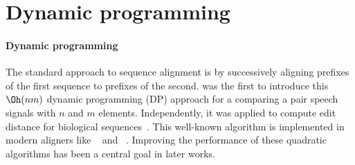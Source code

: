 \section{Dynamic programming}

\paragraph{Dynamic programming} The standard approach to sequence alignment is
by successively aligning prefixes of the first sequence to prefixes of the
second. \citet{vintsyuk1968speech} was the first to introduce this $\Oh(nm)$
dynamic programming (DP) approach for a comparing a pair speech signals with $n$
and $m$ elements. Independently, it was applied to compute edit distance for
biological
sequences~\citep{needleman1970general,sankoff1972matching,sellers1974theory,wagner1974string}.
This well-known algorithm is implemented in modern aligners  like
\seqan~\citep{reinert2017seqan} and \parasail~\citep{daily2016parasail}.
Improving the performance of these quadratic algorithms has been a central goal
in later works.